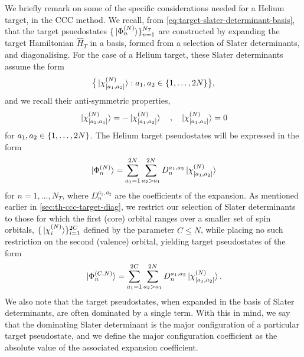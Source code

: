 \documentclass[]{article}
\begin{document}
We briefly remark on some of the specific considerations needed for a Helium
target, in the CCC method.
We recall, from \autoref{eq:target-slater-determinant-basis}, that the target
psuedostates $\lbrace\ket*{\Phi_{n}^{(N)}}\rbrace_{n = 1}^{N_{T}}$ are constructed
by expanding the target Hamiltonian $\hat{H}_{T}$ in a basis, formed from a
selection of Slater determinants, and diagonalising.
For the case of a Helium target, these Slater determinants assume the form
\begin{equation}
  \label{eq:he-target-slater-determinant-basis}
  \lrset[\big]
  {
    \ket*{\chi_{\lrsq{a_{1}, a_{2}}}^{\lr{N}}}
    :
    a_{1}, a_{2}
    \in
    \lrset{1, \dotsc, 2N}
  }
  ,
\end{equation}
and we recall their anti-symmetric properties,
\begin{equation*}
  \ket*{\chi_{\lrsq{a_{2}, a_{1}}}^{\lr{N}}}
  =
  -
  \ket*{\chi_{\lrsq{a_{1}, a_{2}}}^{\lr{N}}}
  \qq{,}
  \ket*{\chi_{\lrsq{a_{1}, a_{1}}}^{\lr{N}}}
  =
  0
\end{equation*}
for $a_{1}, a_{2} \in \lbrace1, \dotsc, 2N\rbrace$.
The Helium target pseudostates will be expressed in the form
\begin{equation}
  \label{eq:he-target-states-expansion}
  \ket*{\Phi_{n}^{\lr{N}}}
  =
  \sum_{a_{1} = 1}^{2N}
  \sum_{a_{2} > a_{1}}^{2N}
  D_{n}^{a_{1}, a_{2}}
  \ket*{\chi_{\lrsq{a_{1}, a_{2}}}^{\lr{N}}}
\end{equation}
for $n = 1, \dotsc, N_{T}$, where $D_{n}^{a_{1}, a_{2}}$ are the coefficients of
the expansion.
As mentioned earlier in \autoref{sec:th-ccc-target-diag}, we restrict our
selection of Slater determinants to those for which the first (core) orbital
ranges over a smaller set of spin orbitals,
$\lbrace\ket*{\chi_{i}^{(N)}}\rbrace_{i = 1}^{2C}$ defined by the parameter
$C \leq N$, while placing no such restriction on the second (valence) orbital,
yielding target pseudostates of the form
\begin{equation}
  \label{eq:he-target-states-expansion-restricted}
  \ket*{\Phi_{n}^{\lr{C, N}}}
  =
  \sum_{a_{1} = 1}^{2C}
  \sum_{a_{2} > a_{1}}^{2N}
  D_{n}^{a_{1}, a_{2}}
  \ket*{\chi_{\lrsq{a_{1}, a_{2}}}^{\lr{N}}}
  .
\end{equation}
We also note that the target pseudostates, when expanded in the basis of Slater
determinants, are often dominated by a single term.
With this in mind, we say that the dominating Slater determinant is the major
configuration of a particular target pseudostate, and we define the major
configuration coefficient as the absolute value of the associated expansion
coefficient.
\end{document}
